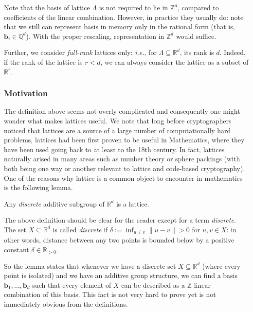 \documentclass[../../book.tex]{subfiles}
\begin{document}
\begin{remark}\label{remark:lattice-in-integers}
Note that the basis of lattice $\Lambda$ is not required to lie in $\mathbb{Z}^d$, compared to coefficients of the linear combination.
However, in practice they usually do: note that we still can represent basis in memory only in the rational form (that is, $\mathbf{b}_i \in \mathbb{Q}^d$).
With the proper rescaling, representation in $\mathbb{Z}^d$ would suffice.
\end{remark}

\begin{remark}
    Further, we consider \textit{full-rank} lattices only: \textit{i.e.}, for $\Lambda \subseteq \mathbb{R}^d$, its rank is $d$. 
    Indeed, if the rank of the lattice is $r<d$, we can always consider the lattice as a subset of $\mathbb{R}^r$.
\end{remark}

\subsubsection*{Motivation}

The definition above seems not overly complicated and consequently one might wonder what makes lattices useful.
We note that long before cryptographers noticed that lattices are a source of a large number of computationally hard problems, lattices had been first proven to be useful in Mathematics, where they have been used going back to at least to the 18th century. 
In fact, lattices naturally arised in many areas such as number theory or sphere packings (with both being one way or another relevant to lattice and code-based cryptography).
One of the reasons why lattice is a common object to encounter in mathematics is the following lemma.

\begin{lemma}
    Any \emph{discrete} additive subgroup of $\mathbb{R}^d$ is a lattice.
\end{lemma}

The above definition should be clear for the reader except for a term \emph{discrete}.
The set $X \subseteq \mathbb{R}^d$ is called \emph{discrete} if $\delta := \inf_{u \neq v}\|u-v\| > 0$ for $u,v \in X$: in other words, distance between any two points is bounded below by a positive constant $\delta \in \mathbb{R}_{>0}$.

So the lemma states that whenever we have a discrete set $X \subseteq \mathbb{R}^d$ (where every point is isolated) and we have an additive group structure, we can find a basis $\mathbf{b}_1,\dots,\mathbf{b}_d$ such that every element of $X$ can be described as a $\mathbb{Z}$-linear combination of this basis.
This fact is not very hard to prove yet is not immediately obvious from the definitions.
\end{document}

